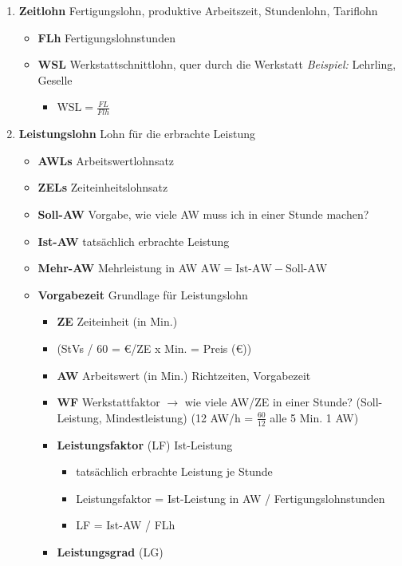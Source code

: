 \begin{enumerate}
\item
  \textbf{Zeitlohn} Fertigungslohn, produktive Arbeitszeit, Stundenlohn,
  Tariflohn

  \begin{itemize}
  \item
    \textbf{FLh} Fertigungslohnstunden
  \item
    \textbf{WSL} Werkstattschnittlohn, quer durch die Werkstatt
    \emph{Beispiel:} Lehrling, Geselle

    \begin{itemize}
    \item
      $\boxed{\text{WSL} = \frac{FL}{Flh}}$
    \end{itemize}
  \end{itemize}
\item
  \textbf{Leistungslohn} Lohn für die erbrachte Leistung

  \begin{itemize}
  \item
    \textbf{AWLs} Arbeitswertlohnsatz
  \item
    \textbf{ZELs} Zeiteinheitslohnsatz
  \item
    \textbf{Soll-AW} Vorgabe, wie viele AW muss ich in einer Stunde
    machen?
  \item
    \textbf{Ist-AW} tatsächlich erbrachte Leistung
  \item
    \textbf{Mehr-AW} Mehrleistung in AW
    $\boxed{\text{AW} = \text{Ist-AW} - \text{Soll-AW}}$
  \item
    \textbf{Vorgabezeit} Grundlage für Leistungslohn

    \begin{itemize}
    \item
      \textbf{ZE} Zeiteinheit (in Min.)
    \item
      (StVs / 60 = €/ZE x Min. = Preis (€))
    \item
      \textbf{AW} Arbeitswert (in Min.) Richtzeiten, Vorgabezeit
    \item
      \textbf{WF} Werkstattfaktor $\to$ wie viele AW/ZE in einer
      Stunde? (Soll-Leistung, Mindestleistung) (12 AW/h =
      $\frac{60}{12}$ alle 5 Min. 1 AW)
    \item
      \textbf{Leistungsfaktor} (LF) Ist-Leistung

      \begin{itemize}
      \item
        tatsächlich erbrachte Leistung je Stunde
      \item
        Leistungsfaktor = Ist-Leistung in AW / Fertigungslohnstunden
      \item
        LF = Ist-AW / FLh
      \end{itemize}
    \item
      \textbf{Leistungsgrad} (LG)


\end{itemize}
\end{itemize}
\end{enumerate}
